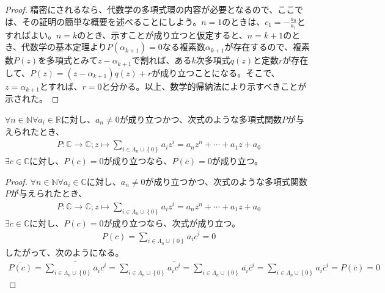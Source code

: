 \documentclass[dvipdfmx]{jsarticle}
\begin{document}
\begin{proof}
精密にされるなら、代数学の多項式環の内容が必要となるので、ここでは、その証明の簡単な概要を述べることにしよう。$n = 1$のときは、$c_{1} = - \frac{a_{0}}{a_{1}}$とすればよい。$n = k$のとき、示すことが成り立つと仮定すると、$n = k + 1$のとき、代数学の基本定理より$P\left( \alpha_{k + 1} \right) = 0$なる複素数$\alpha_{k + 1}$が存在するので、複素数$P(z)$を多項式とみて$z - \alpha_{k + 1}$で割れば、ある$k$次多項式$q(z)$と定数$r$が存在して、$P(z) = \left( z - \alpha_{k + 1} \right)q(z) + r$が成り立つことになる。そこで、$z = \alpha_{k + 1}$とすれば、$r = 0$と分かる。以上、数学的帰納法により示すべきことが示された。
\end{proof}
\begin{thm}\label{4.3.2.12}
$\forall n \in \mathbb{N}\forall a_{i} \in \mathbb{R}$に対し、$a_{n} \neq 0$が成り立つかつ、次式のような多項式関数$P$が与えられたとき、
\begin{align*}
P:\mathbb{C} \rightarrow \mathbb{C};z \mapsto \sum_{i \in \varLambda_{n} \cup \left\{ 0 \right\}} {a_{i}z^{i}} = a_{n}z^{n} + \cdots + a_{1}z + a_{0}
\end{align*}
$\exists c \in \mathbb{C}$に対し、$P(c) = 0$が成り立つなら、$P\left( \overline{c} \right) = 0$が成り立つ。
\end{thm}
\begin{proof}
$\forall n \in \mathbb{N}\forall a_{i} \in \mathbb{C}$に対し、$a_{n} \neq 0$が成り立つかつ、次式のような多項式関数$P$が与えられたとき、
\begin{align*}
P:\mathbb{C} \rightarrow \mathbb{C};z \mapsto \sum_{i \in \varLambda_{n} \cup \left\{ 0 \right\}} {a_{i}z^{i}} = a_{n}z^{n} + \cdots + a_{1}z + a_{0}
\end{align*}
$\exists c \in \mathbb{C}$に対し、$P(c) = 0$が成り立つなら、次式が成り立つ。
\begin{align*}
P(c) = \sum_{i \in \varLambda_{n} \cup \left\{ 0 \right\}} {a_{i}c^{i}} = 0
\end{align*}
したがって、次のようになる。
\begin{align*}
\overline{P(c)} = \overline{\sum_{i \in \varLambda_{n} \cup \left\{ 0 \right\}} {a_{i}c^{i}}} = \sum_{i \in \varLambda_{n} \cup \left\{ 0 \right\}} \overline{a_{i}c^{i}} = \sum_{i \in \varLambda_{n} \cup \left\{ 0 \right\}} {\overline{a_{i}}{\overline{c}}^{i}} = \sum_{i \in \varLambda_{n} \cup \left\{ 0 \right\}} {a_{i}{\overline{c}}^{i}} = P\left( \overline{c} \right) = 0
\end{align*}
\end{proof}
\end{document}
